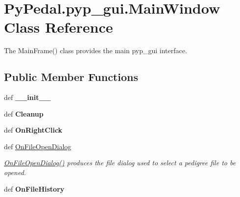 \hypertarget{classPyPedal_1_1pyp__gui_1_1MainWindow}{
\section{PyPedal.pyp\_\-gui.MainWindow Class Reference}
\label{classPyPedal_1_1pyp__gui_1_1MainWindow}
}


The MainFrame() class provides the main pyp\_\-gui interface.  


\subsection*{Public Member Functions}
\begin{DoxyCompactItemize}
\item 
\hypertarget{classPyPedal_1_1pyp__gui_1_1MainWindow_ad8398bf01bd6660d4bbdebdb2cb5ed7c}{
def {\bfseries \_\-\_\-init\_\-\_\-}}
\label{classPyPedal_1_1pyp__gui_1_1MainWindow_ad8398bf01bd6660d4bbdebdb2cb5ed7c}

\item 
\hypertarget{classPyPedal_1_1pyp__gui_1_1MainWindow_a08371bed851f8d22027dd934d9172747}{
def {\bfseries Cleanup}}
\label{classPyPedal_1_1pyp__gui_1_1MainWindow_a08371bed851f8d22027dd934d9172747}

\item 
\hypertarget{classPyPedal_1_1pyp__gui_1_1MainWindow_ac83a9d469f275aa9bbbbb69fb46d448a}{
def {\bfseries OnRightClick}}
\label{classPyPedal_1_1pyp__gui_1_1MainWindow_ac83a9d469f275aa9bbbbb69fb46d448a}

\item 
def \hyperlink{classPyPedal_1_1pyp__gui_1_1MainWindow_a1eb6f25d8001093641719422d5b8c0fe}{OnFileOpenDialog}
\begin{DoxyCompactList}\small\item\em \hyperlink{classPyPedal_1_1pyp__gui_1_1MainWindow_a1eb6f25d8001093641719422d5b8c0fe}{OnFileOpenDialog()} produces the file dialog used to select a pedigree file to be opened. \end{DoxyCompactList}\item 
\hypertarget{classPyPedal_1_1pyp__gui_1_1MainWindow_a037366334082192348381b0ea8549b05}{
def {\bfseries OnFileHistory}}
\label{classPyPedal_1_1pyp__gui_1_1MainWindow_a037366334082192348381b0ea8549b05}


\end{DoxyCompactItemize}
